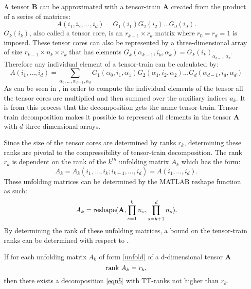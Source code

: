 A tensor \textbf{B} can be approximated with a tensor-train \textbf{A} created from the product of a series of matrices:
\begin{equation}\label{tensaprox}
A(i_1,i_2,...,i_d) = G_1(i_1)G_2(i_2)...G_d(i_d).
\end{equation}
$G_k(i_k)$, also called a tensor core, is an $r_{k-1} \times r_k$ matrix where $r_0 = r_d=1$ is imposed. These tensor cores can also be represented by a three-dimensional array of size $r_{k-1} \times n_k \times r_k$ that has elements $G_k(\alpha_{k-1},i_k,\alpha_k)= G_k(i_k)_{\alpha_{k-1},\alpha_k}$. Therefore any individual element of a tensor-train can be calculated by:
\begin{equation}\label{eqn5}
A(i_1,...,i_d) = \sum_{\alpha_0,...,\alpha_{d-1},\alpha_d}G_1(\alpha_0,i_1,\alpha_1)G_2(\alpha_1,i_2,\alpha_2)...G_d(\alpha_{d-1},i_d,\alpha_d)
\end{equation}
As can be seen in , in order to compute the individual elements of the tensor all the tensor cores are multiplied and then summed over the auxiliary indices $a_k$. It is from this process that the decomposition gets the name tensor-train. Tensor-train decomposition makes it possible to represent all elements in the tensor \textbf{A} with $d$ three-dimensional arrays.\cite{Osel1}
 
Since the size of the tensor cores are determined by ranks $r_k$, determining these ranks are pivotal to the compressibility of tensor-train decomposition. The rank $r_k$ is dependent on the rank of the $k^{th}$ unfolding matrix $A_k$ which has the form:
\begin{equation}\label{unfold}
A_k = A_k(i_1,...,i_k;i_{k+1},...,i_d) = A(i_1,...,i_d).
\end{equation}
These unfolding matrices can be determined by the MATLAB reshape function as such:
\begin{equation*}
A_k = \textnormal{reshape} (\textbf{A},\prod_{s=1}^{k}n_s,\prod_{s=k+1}^{d}n_s).
\end{equation*}
By determining the rank of these unfolding matrices, a bound on the tensor-train ranks can be determined with respect to . \cite{Osel1}
\begin{theorem}\label{ttranks}
If for each unfolding matrix $A_k$ of form \ref{unfold} of a d-dimensional tensor \textbf{A}
\begin{equation*}
\textnormal{rank }A_k = r_k, 
\end{equation*}
then there exists a decomposition \ref{eqn5} with TT-ranks not higher than $r_k$.
\end{theorem}

